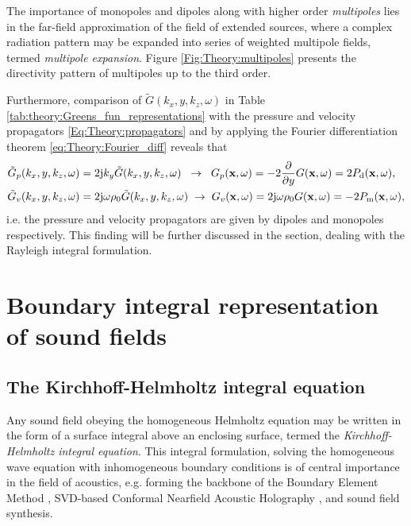 The importance of monopoles and dipoles along with higher order \emph{multipoles} lies in the far-field approximation of the field of extended sources,
where a complex radiation pattern may be expanded into series of weighted multipole fields, termed \emph{multipole expansion}.
Figure \ref{Fig:Theory:multipoles} presents the directivity pattern of multipoles up to the third order.

Furthermore, comparison of $\tilde{G}(k_x,y,k_z,\omega)$ in Table \ref{tab:theory:Greens_fun_representations}  with the pressure and velocity propagators \eqref{Eq:Theory:propagators} and by applying the Fourier differentiation theorem \eqref{eq:Theory:Fourier_diff} reveals that
\begin{align}
\tilde{G}_p(k_x,y,k_z,\omega) &=  2 \mathrm{j} k_y \tilde{G}(k_x,y,k_z,\omega) 
\hspace{2mm} \rightarrow \hspace{2mm} 
G_p(\mathbf{x},\omega) = -2 \frac{\partial}{\partial y} G(\mathbf{x},\omega) = 2 P_{\mathrm{d}}(\mathbf{x},\omega),
\\
\tilde{G}_v(k_x,y,k_z,\omega) &=  2 \mathrm{j} \omega \rho_0 \tilde{G}(k_x,y,k_z,\omega) 
\hspace{1mm} \rightarrow \hspace{1mm} 
G_v(\mathbf{x},\omega) = 2 \mathrm{j} \omega \rho_0 G(\mathbf{x},\omega) = -2P_{\mathrm{m}}(\mathbf{x},\omega),
\end{align}
i.e. the pressure and velocity propagators are given by dipoles and monopoles respectively.
This finding will be further discussed in the section, dealing with the Rayleigh integral formulation.

\section{Boundary integral representation of sound fields}

\subsection{The Kirchhoff-Helmholtz integral equation}
Any sound field obeying the homogeneous Helmholtz equation may be written in the form of a surface integral above an enclosing surface, termed the \emph{Kirchhoff-Helmholtz integral equation}. 
This integral formulation, solving the homogeneous wave equation with inhomogeneous boundary conditions is of central importance in the field of acoustics, e.g. forming the backbone of the Boundary Element Method \cite{Kirkup2007, Marburg2008}, SVD-based Conformal Nearfield Acoustic Holography \cite{Williams1999, Bai1992, Wu2010}, and sound field synthesis.

